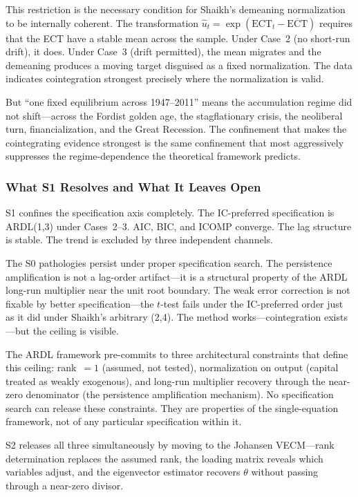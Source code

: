 \documentclass[11pt,a4paper]{article}
\begin{document}
This restriction is the necessary condition for Shaikh's demeaning normalization to be internally coherent. The transformation $\hat{u}_t = \exp(\text{ECT}_t - \overline{\text{ECT}})$ requires that the ECT have a stable mean across the sample. Under Case~2 (no short-run drift), it does. Under Case~3 (drift permitted), the mean migrates and the demeaning produces a moving target disguised as a fixed normalization. The data indicates cointegration strongest precisely where the normalization is valid.

But ``one fixed equilibrium across 1947--2011'' means the accumulation regime did not shift---across the Fordist golden age, the stagflationary crisis, the neoliberal turn, financialization, and the Great Recession. The confinement that makes the cointegrating evidence strongest is the same confinement that most aggressively suppresses the regime-dependence the theoretical framework predicts.


\subsubsection{What S1 Resolves and What It Leaves Open}

S1 confines the specification axis completely. The IC-preferred specification is ARDL(1,3) under Cases~2--3. AIC, BIC, and ICOMP converge. The lag structure is stable. The trend is excluded by three independent channels.

The S0 pathologies persist under proper specification search. The persistence amplification is not a lag-order artifact---it is a structural property of the ARDL long-run multiplier near the unit root boundary. The weak error correction is not fixable by better specification---the $t$-test fails under the IC-preferred order just as it did under Shaikh's arbitrary (2,4). The method works---cointegration exists---but the ceiling is visible.

The ARDL framework pre-commits to three architectural constraints that define this ceiling: rank~$= 1$ (assumed, not tested), normalization on output (capital treated as weakly exogenous), and long-run multiplier recovery through the near-zero denominator (the persistence amplification mechanism). No specification search can release these constraints. They are properties of the single-equation framework, not of any particular specification within it.

S2 releases all three simultaneously by moving to the Johansen VECM---rank determination replaces the assumed rank, the loading matrix reveals which variables adjust, and the eigenvector estimator recovers $\theta$ without passing through a near-zero divisor.
\end{document}
